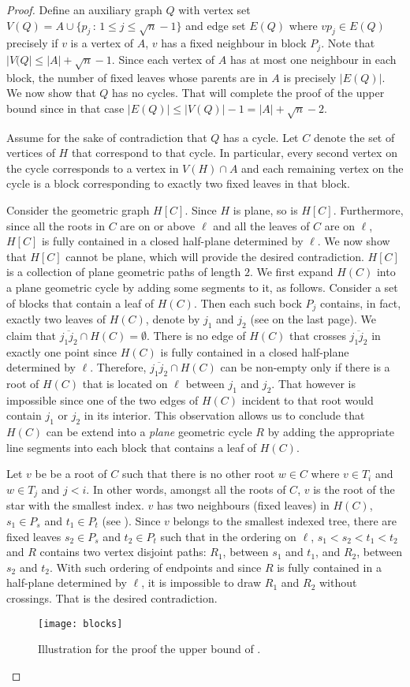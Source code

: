 \documentclass[lotsofwhite,charterfonts, letter]{patmorin}
\newcommand{\seg}[2]{\ensuremath{\overline{#1#2}}}
\newcommand{\Figure}[4][htb]{
\begin{figure}[#1]
  \vspace*{1ex}
  \begin{center}#3\end{center}
	\vspace*{-2ex}
	\caption{\figlabel{#2}#4}
\end{figure}}
\begin{document}
\begin{proof}
Define an auxiliary graph $Q$ with vertex set $V(Q)=A\cup \{p_j\,:\, 1\leq j\leq \sqrt{n}-1\}$ and edge set $E(Q)$ where $vp_j\in E(Q)$ precisely if $v$ is a vertex of $A$, $v$ has a fixed neighbour in block $P_j$. Note that $|V(Q|\leq |A|+\sqrt{n}-1$. Since each vertex of $A$ has at most one neighbour in each block, the number of fixed leaves whose parents are in  $A$ is precisely $|E(Q)|$. We now show that $Q$ has no cycles. That will complete the proof of the upper bound since in that case $|E(Q)|\leq |V(Q)|-1=|A|+\sqrt{n}-2$.


Assume for the sake of contradiction that $Q$ has a cycle. Let $C$ denote the set of vertices of $H$ that correspond to that cycle. In particular, every second vertex on the cycle corresponds to a vertex in $V(H)\cap A$ and each remaining vertex on the cycle is a block corresponding to exactly two fixed leaves in that block. 

Consider the geometric graph $H[C]$. Since $H$ is plane, so is $H[C]$. Furthermore, since all the roots in $C$ are on or above $\ell$ and all the leaves of $C$ are on $\ell$, $H[C]$ is fully contained in a closed half-plane determined by $\ell$. We now show that $H[C]$ cannot be plane, which will provide the desired contradiction. $H[C]$ is a collection of plane geometric paths of length $2$. We first expand $H(C)$ into a plane geometric cycle by adding some segments to it, as follows. Consider a set of blocks that contain a leaf of $H(C)$. Then each such bock $P_j$ contains, in fact, exactly two leaves of $H(C)$, denote by $j_1$ and $j_2$ (see  on the last page). We claim that $\seg{j_1}{j_2}\cap H(C)=\emptyset$. There is no edge of $H(C)$ that crosses $\seg{j_1}{j_2}$ in exactly one point since $H(C)$ is fully contained in a closed half-plane determined by $\ell$. Therefore, $\seg{j_1}{j_2}\cap H(C)$ can be non-empty only if there is a root of $H(C)$ that is located on $\ell$ between $j_1$ and $j_2$. That however is impossible since one of the two edges of $H(C)$ incident to that root would contain $j_1$ or $j_2$ in its interior. This observation allows us to conclude that $H(C)$ can be extend into a \emph{plane} geometric cycle $R$ by adding the appropriate line segments into each block that contains a leaf of $H(C)$.


Let $v$ be be a root of $C$ such that there is no other root $w\in C$ where $v\in T_i$ and $w\in T_j$ and $j<i$. In other words, amongst all the roots of $C$, $v$ is the root of the star with the smallest index.  $v$ has two neighbours (fixed leaves) in $H(C)$,  $s_1\in P_s$ and $t_1\in P_t$ (see ). Since $v$ belongs to the smallest indexed tree, there are fixed leaves $s_2\in P_s$  and $t_2\in P_t$ such that in the ordering on $\ell$, $s_1 < s_2 <t_1<t_2$ and $R$ contains two vertex disjoint paths: $R_1$, between $s_1$ and $t_1$, and $R_2$, between $s_2$ and $t_2$. With such ordering of endpoints and since $R$ is fully contained in a half-plane determined by $\ell$, it is impossible to draw $R_1$ and $R_2$ without crossings. That is the desired contradiction.
%
\Figure{blocks}{\texttt{[image: blocks]}
}{Illustration for the proof the upper bound of \thmref{trees-lb}.}



\end{proof}
\end{document}
